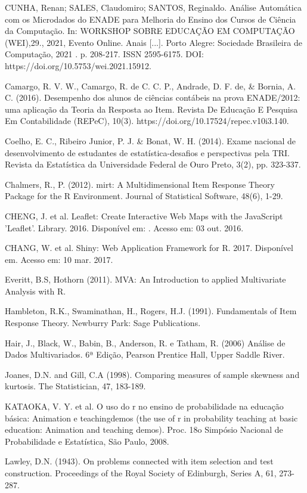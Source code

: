\documentclass[12pt]{article}
\begin{document}
CUNHA, Renan; SALES, Claudomiro; SANTOS, Reginaldo. Análise Automática com os Microdados do ENADE para Melhoria do Ensino dos Cursos de Ciência da Computação. In: WORKSHOP SOBRE EDUCAÇÃO EM COMPUTAÇÃO (WEI),29., 2021, Evento Online. Anais [...]. Porto Alegre: Sociedade Brasileira de Computação, 2021 . p. 208-217. ISSN 2595-6175. DOI: https://doi.org/10.5753/wei.2021.15912.

Camargo, R. V. W., Camargo, R. de C. C. P., Andrade, D. F. de, \& Bornia, A. C. (2016). Desempenho dos alunos de ciências contábeis na prova ENADE/2012: uma aplicação da Teoria da Resposta ao Item. Revista De Educação E Pesquisa Em Contabilidade (REPeC), 10(3). https://doi.org/10.17524/repec.v10i3.140.

Coelho, E. C., Ribeiro Junior, P. J. \& Bonat, W. H. (2014). Exame nacional de desenvolvimento de estudantes de estatística-desafios e perspectivas pela TRI. Revista da Estatística da Universidade Federal de Ouro Preto, 3(2), pp. 323-337.


Chalmers, R., P. (2012). mirt: A Multidimensional Item Response Theory Package for the R Environment. Journal of Statistical Software, 48(6), 1-29. 

CHENG, J. et al. Leaflet: Create Interactive Web Maps with the JavaScript ’Leaflet’. Library. 2016. Disponível em: . Acesso em: 03 out. 2016.

CHANG, W. et al. Shiny: Web Application Framework for R. 2017. Disponível em. Acesso em: 10 mar. 2017.

Everitt, B.S, Hothorn (2011). MVA: An Introduction to applied Multivariate Analysis with R.

Hambleton, R.K., Swaminathan, H., Rogers, H.J. (1991). Fundamentals of Item Response Theory. Newburry Park: Sage Publications.

Hair, J., Black, W., Babin, B., Anderson, R. e Tatham, R. (2006) Análise de Dados Multivariados. 6ª Edição, Pearson Prentice Hall, Upper Saddle River.

Joanes, D.N. and Gill, C.A (1998). Comparing measures of sample skewness and kurtosis. The Statistician, 47, 183-189.

KATAOKA, V. Y. et al. O uso do r no ensino de probabilidade na educação básica: Animation e teachingdemos (the use of r in probability teaching at basic education: Animation and teaching demos). Proc. 18o Simpósio Nacional de Probabilidade e Estatística, São Paulo, 2008.

Lawley, D.N. (1943). On problems connected with item selection and test construction. Proceedings of the Royal Society of Edinburgh, Series A, 61, 273-287. 
\end{document}
